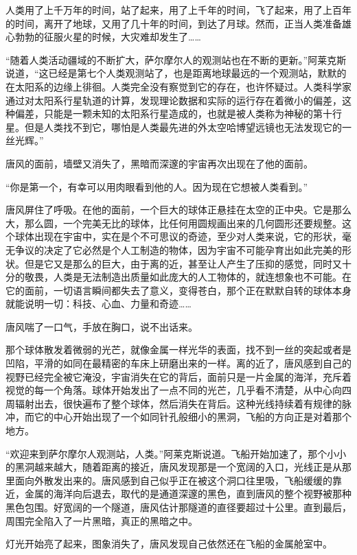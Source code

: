 人类用了上千万年的时间，站了起来，用了上千年的时间，飞了起来，用了上百年的时间，离开了地球，又用了几十年的时间，到达了月球。然而，正当人类准备雄心勃勃的征服火星的时候，大灾难却发生了……

“随着人类活动疆域的不断扩大，萨尔摩尔人的观测站也在不断的更新。”阿莱克斯说道，“这已经是第七个人类观测站了，也是距离地球最远的一个观测站，默默的在太阳系的边缘上徘徊。人类完全没有察觉到它的存在，也许怀疑过。人类科学家通过对太阳系行星轨道的计算，发现理论数据和实际的运行存在着微小的偏差，这种偏差，只能是一颗未知的太阳系行星造成的，也就是被人类称为神秘的第十行星。但是人类找不到它，哪怕是人类最先进的外太空哈博望远镜也无法发现它的一丝光辉。”

唐风的面前，墙壁又消失了，黑暗而深邃的宇宙再次出现在了他的面前。

“你是第一个，有幸可以用肉眼看到他的人。因为现在它想被人类看到。”

唐风屏住了呼吸。在他的面前，一个巨大的球体正悬挂在太空的正中央。它是那么大，那么圆，一个完美无比的球体，比任何用圆规画出来的几何圆形还要规整。这个球体出现在宇宙中，实在是个不可思议的奇迹，至少对人类来说，它的形状，毫无争议的决定了它必然是个人工制造的物体，因为宇宙不可能孕育出如此完美的形状。但是它又是那么的巨大，由于离的近，甚至让人产生了压抑的感觉，同时又十分的敬畏，人类是无法制造出质量如此庞大的人工物体的，就连想象也不可能。在它的面前，一切语言瞬间都失去了意义，变得苍白，那个正在默默自转的球体本身就能说明一切：科技、心血、力量和奇迹……

唐风喘了一口气，手放在胸口，说不出话来。

那个球体散发着微弱的光芒，就像金属一样光华的表面，找不到一丝的突起或者是凹陷，平滑的如同在最精密的车床上研磨出来的一样。离的近了，唐风感到自己的视野已经完全被它淹没，宇宙消失在它的背后，面前只是一片金属的海洋，充斥着视觉的每一个角落。球体开始发出了一点不同的光芒，几乎看不清楚，从中心向四周辐射出去，很快遍布了整个球体，然后消失在背后。这种光线持续着有规律的脉冲，而它的中心开始出现了一个如同针孔般细小的黑洞，飞船的方向正是对着那个地方。

“欢迎来到萨尔摩尔人观测站，人类。”阿莱克斯说道。飞船开始加速了，那个小小的黑洞越来越大，随着距离的接近，唐风发现那是一个宽阔的入口，光线正是从那里面向外散发出来的。唐风感到自己似乎正在被这个洞口往里吸，飞船缓缓的靠近，金属的海洋向后退去，取代的是通道深邃的黑色，直到唐风的整个视野被那种黑色包围。好宽阔的一个隧道，唐风估计那隧道的直径要超过十公里。直到最后，周围完全陷入了一片黑暗，真正的黑暗之中。

灯光开始亮了起来，图象消失了，唐风发现自己依然还在飞船的金属舱室中。

